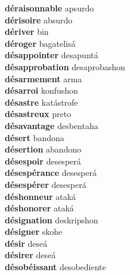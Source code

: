 \textbf{ déraisonnable  } apsurdo \\
\textbf{ dérisoire  } absurdo \\
\textbf{ dériver  } bin \\
\textbf{ déroger  } bagatelisá \\
\textbf{ désappointer  } desapuntá \\
\textbf{ désapprobation  } desaprobashon \\
\textbf{ désarmement  } arma \\
\textbf{ désarroi  } konfushon \\
\textbf{ désastre  } katástrofe \\
\textbf{ désastreux  } preto \\
\textbf{ désavantage  } desbentaha \\
\textbf{ désert  } bandona \\
\textbf{ désertion  } abandono \\
\textbf{ désespoir  } desesperá \\
\textbf{ désespérance  } desesperá \\
\textbf{ désespérer  } desesperá \\
\textbf{ déshonneur  } ataká \\
\textbf{ déshonorer  } ataká \\
\textbf{ désignation  } deskripshon \\
\textbf{ désigner  } skohe \\
\textbf{ désir  } deseá \\
\textbf{ désirer  } deseá \\
\textbf{ désobéissant  } desobediente \\
